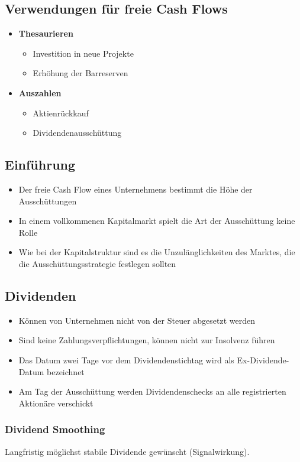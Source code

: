 \subsection{Verwendungen für freie Cash Flows}
\begin{itemize}
	\item \textbf{Thesaurieren}
	\begin{itemize}
		\item Investition in neue Projekte
		\item Erhöhung der Barreserven
	\end{itemize}
	\item \textbf{Auszahlen}
	\begin{itemize}
		\item Aktienrückkauf
		\item Dividendenausschüttung
	\end{itemize}
\end{itemize}


\subsection{Einführung}
\begin{itemize}
	\item Der freie Cash Flow eines Unternehmens bestimmt die Höhe der Ausschüttungen
	\item In einem vollkommenen Kapitalmarkt spielt die Art der Ausschüttung keine Rolle
	\item Wie bei der Kapitalstruktur sind es die Unzulänglichkeiten des Marktes, die die Ausschüttungsstrategie festlegen sollten
\end{itemize}


\subsection{Dividenden}
\begin{itemize}
	\item Können von Unternehmen nicht von der Steuer abgesetzt werden
	\item Sind keine Zahlungsverpflichtungen, können nicht zur Insolvenz führen
	\item Das Datum zwei Tage vor dem Dividendenstichtag wird als Ex-Dividende-Datum bezeichnet
	\item Am Tag der Ausschüttung werden Dividendenschecks an alle registrierten Aktionäre verschickt
\end{itemize}

\subsubsection{Dividend Smoothing}
Langfristig möglichst stabile Dividende gewünscht (Signalwirkung).


